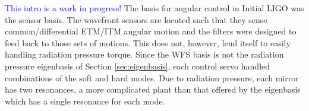 






\textcolor{blue}{This intro is a work in progress!}
The basis for angular control in Initial LIGO was the sensor
basis. The wavefront sensors are located such that they sense
common/differential ETM/ITM angular motion and the filters were
designed to feed back to those sets of motions. This does not, however,
lend itself to easily handling radiation pressure torque. Since the
WFS basis is not the radiation pressure eigenbasis of Section
\ref{sec:eigenbasis}, each control servo handled combinations of the
soft and hard modes. Due to radiation pressure, each mirror has two
resonances, a more complicated plant than that offered by the
eigenbasis which has a single resonance for each mode.


